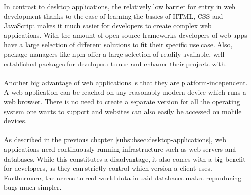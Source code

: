 
In contrast to desktop applications, the relatively low barrier for entry in web development thanks to the ease of learning
the basics of HTML, CSS and JavaScript makes it much easier for developers to create complex web applications. 
With the amount of open source frameworks developers of web apps have a large selection of different solutions to fit
their specific use case.
Also, package managers like npm offer a large selection of readily available, well established packages for developers to use
and enhance their projects with.\paragraph{}
Another big advantage of web applications is that they are platform-independent. 
A web application can be reached on any reasonably modern device which runs a web browser.
There is no need to create a separate version for all the operating system one wants to support and 
websites can also easily be accessed on mobile devices.\paragraph{}
As described in the previous chapter \ref{subsubsec:desktop-applications}, web applications need continuously running infrastructure such as
web servers and databases. 
While this constitutes a disadvantage, it also comes with a big benefit for developers, as they can strictly control which version 
a client uses.
Furthermore, the access to real-world data in said databases makes reproducing bugs much simpler. \parencite{jacobs2005}